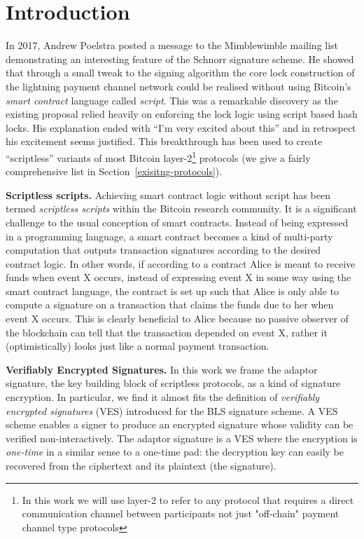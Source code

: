 \section{Introduction}

In 2017, Andrew Poelstra posted a message to the Mimblewimble mailing list\cite{poelstra-bitcoin-dev-scriptless} demonstrating an interesting feature of the Schnorr signature scheme. He showed that through a small tweak to the signing algorithm the core lock construction of the lightning payment channel network\cite{poon2016bitcoin} could be realised without using Bitcoin's \emph{smart contract} language called \emph{script}. This was a remarkable discovery as the existing proposal relied heavily on enforcing the lock logic using script based hash locks. His explanation ended with ``I'm very excited about this'' and in retrospect his excitement seems justified. This breakthrough has been used to create ``scriptless'' variants of most Bitcoin layer-2\footnote{In this work we will use layer-2 to refer to any protocol that requires a direct communication channel between participants not just "off-chain" payment channel type protocols} protocols (we give a fairly comprehensive list in Section~\ref{exisitng-protocols}).

\textbf{Scriptless scripts.} Achieving smart contract logic without script has been termed \emph{scriptless scripts} within the Bitcoin research community. It is a significant challenge to the usual conception of smart contracts. Instead of being expressed in a programming language, a smart contract becomes a kind of multi-party computation that outputs transaction signatures according to the desired contract logic. In other words, if according to a contract Alice is meant to receive funds when event X occurs, instead of expressing event X in some way using the smart contract language, the contract is set up such that Alice is only able to compute a signature on a transaction that claims the funds due to her when event X occurs. This is clearly beneficial to Alice because no passive observer of the blockchain can tell that the transaction depended on event X, rather it (optimistically) looks just like a normal payment transaction.

\textbf{Verifiably Encrypted Signatures.} In this work we frame the adaptor signature, the key building block of scriptless protocols, as a kind of signature encryption. In particular, we find it almost fits the definition of \emph{verifiably encrypted signatures}\cite{Boneh:2003:AVE:1766171.1766207} (VES) introduced for the BLS signature scheme\cite{Boneh:2001:SSW:647097.717005}. A VES scheme enables a signer to produce an encrypted signature whose validity can be verified non-interactively. The adaptor signature is a VES where the encryption is \emph{one-time} in a similar sense to a one-time pad: the decryption key can easily be recovered from the ciphertext and its plaintext (the signature).

